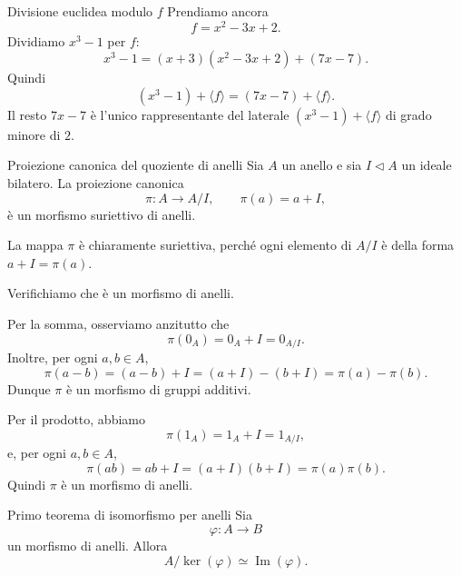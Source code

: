 \documentclass[a4paper]{article}
\begin{document}
\begin{radioactive}
\begin{snippetexample}{Divisione euclidea modulo \(f\)}
    Prendiamo ancora
    \[
        f=x^2-3x+2.
    \]
    Dividiamo \(x^3-1\) per \(f\):
    \[
        x^3-1
        =
        (x+3)(x^2-3x+2)+(7x-7).
    \]
    Quindi
    \[
        (x^3-1)+\langle f \rangle
        =
        (7x-7)+\langle f \rangle.
    \]
    Il resto \(7x-7\) è l'unico rappresentante del laterale \((x^3-1)+\langle f \rangle\) di grado minore di \(2\).
\end{snippetexample}
\end{radioactive}

\pagebreak

\begin{radioactive}
\begin{snippetproposition}{Proiezione canonica del quoziente di anelli}
    Sia \(A\) un anello e sia \(I\triangleleft A\) un ideale bilatero.
    La proiezione canonica
    \[
        \pi\colon A\to A/I,
        \qquad
        \pi(a)=a+I,
    \]
    è un morfismo suriettivo di anelli.
\end{snippetproposition}
\end{radioactive}

\begin{radioactive}
\begin{snippetproof}{}
    La mappa \(\pi\) è chiaramente suriettiva, perché ogni elemento di \(A/I\) è della forma \(a+I=\pi(a)\).

    Verifichiamo che è un morfismo di anelli.

    Per la somma, osserviamo anzitutto che
    \[
        \pi(0_A)=0_A+I=0_{A/I}.
    \]
    Inoltre, per ogni \(a,b\in A\),
    \[
        \pi(a-b)
        =
        (a-b)+I
        =
        (a+I)-(b+I)
        =
        \pi(a)-\pi(b).
    \]
    Dunque \(\pi\) è un morfismo di gruppi additivi.

    Per il prodotto, abbiamo
    \[
        \pi(1_A)=1_A+I=1_{A/I},
    \]
    e, per ogni \(a,b\in A\),
    \[
        \pi(ab)
        =
        ab+I
        =
        (a+I)(b+I)
        =
        \pi(a)\pi(b).
    \]
    Quindi \(\pi\) è un morfismo di anelli.
\end{snippetproof}
\end{radioactive}

\begin{radioactive}
\begin{snippettheorem}{Primo teorema di isomorfismo per anelli}
    Sia
    \[
        \varphi\colon A\to B
    \]
    un morfismo di anelli. Allora
    \[
        A/\ker(\varphi)\simeq \operatorname{Im}(\varphi).
    \]
\end{snippettheorem}
\end{radioactive}
\end{document}
